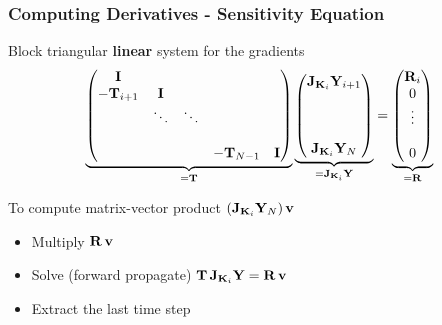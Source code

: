 \documentclass[12pt,fleqn, beamer]{beamer}
\begin{document}
\begin{frame}\frametitle{Computing Derivatives - Sensitivity Equation}

Block triangular {\bf linear} system for the gradients
{\small
\begin{eqnarray*}
	\underbrace{
\begin{pmatrix}
{\bf I}              &                &                &          &       \\
-{\bf T}_{i+1}    &   {\bf I}       &                &          &       \\
                    & \ddots    &  \ddots    &          &      \\
                    &     &      &          &      \\
                    &     &        &   -{\bf T}_{N-1}       & {\bf I}
                    \end{pmatrix}}_{={\bf T}}
					\underbrace{
                    \begin{pmatrix}
                    {\bf J}_{{\bf K}_i}{\bf Y}_{i+1} \\    \\   \\ \\   {\bf J}_{{\bf K}_i}{\bf Y}_{N}
                    \end{pmatrix}}_{= {{\bf J}_{{\bf K}_i} {\bf Y}}} =
					\underbrace{
                    \begin{pmatrix}
                    {\bf R}_i \\  0\\  \vdots \\ \\    0
                    \end{pmatrix}}_{={\bf R}}
\end{eqnarray*}}

To compute matrix-vector product $({\bf J}_{{\bf K}_i}{\bf Y}_{N})\, {\bf v}$
\begin{itemize}
\item Multiply ${\bf R}\, {\bf v}$
\item Solve (forward propagate) ${\bf T}\, {\bf J}_{{\bf K}_i}{\bf Y} = {\bf R}\, {\bf v}$
\item Extract the last time step
\end{itemize}

\end{frame}
\end{document}
